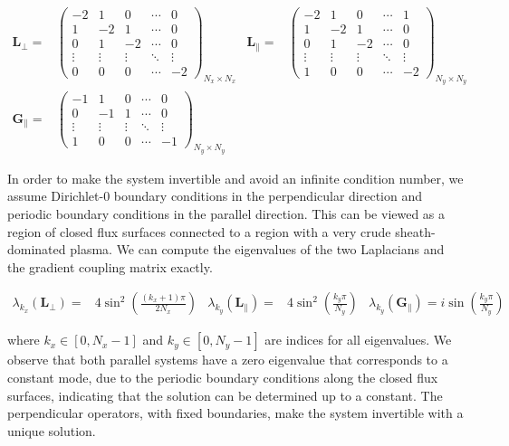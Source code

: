\begin{align}
	\mathbf{L}_\perp =& \begin{pmatrix}
		-2 & 1 & 0 & \cdots & 0 \\
		1 & -2 & 1 & \cdots & 0 \\
		0 & 1 & -2 & \cdots & 0 \\
		\vdots & \vdots & \vdots & \ddots & \vdots \\
		0 & 0 & 0 & \cdots & -2
	\end{pmatrix}_{N_x \times N_x} &
	\mathbf{L}_\parallel =& \begin{pmatrix}
		-2 & 1 & 0 & \cdots & 1 \\
		1 & -2 & 1 & \cdots & 0 \\
		0 & 1 & -2 & \cdots & 0 \\
		\vdots & \vdots & \vdots & \ddots & \vdots \\
		1 & 0 & 0 & \cdots & -2
	\end{pmatrix}_{N_y \times N_y} \nonumber\\
	\mathbf{G}_\parallel =& \begin{pmatrix}
		-1 & 1 & 0 & \cdots & 0 \\
		0 & -1 & 1 & \cdots & 0 \\
		\vdots & \vdots & \vdots & \ddots & \vdots \\
		1 & 0 & 0 & \cdots & -1
	\end{pmatrix}_{N_y \times N_y}
\end{align}

In order to make the system invertible and avoid an infinite condition number, we assume Dirichlet-0 boundary conditions in the perpendicular direction and periodic boundary conditions in the parallel direction. This can be viewed as a region of closed flux surfaces connected to a region with a very crude sheath-dominated plasma. We can compute the eigenvalues of the two Laplacians and the gradient coupling matrix exactly.

\begin{align}
	\lambda_{k_x}(\mathbf{L}_\perp) =& 4\sin^2\left(\frac{(k_x+1)\pi}{2N_x}\right)  & \lambda_{k_y}(\mathbf{L}_\parallel) =& 4\sin^2\left(\frac{k_y\pi}{N_y}\right) & \lambda_{k_y}(\mathbf{G}_\parallel) = i\sin\left(\frac{k_y\pi}{N_y}\right)
\end{align}

where $k_x\in[0,N_x-1]$ and $k_y\in[0,N_y-1]$ are indices for all eigenvalues. We observe that both parallel systems have a zero eigenvalue that corresponds to a constant mode, due to the periodic boundary conditions along the closed flux surfaces, indicating that the solution can be determined up to a constant. The perpendicular operators, with fixed boundaries, make the system invertible with a unique solution. 

